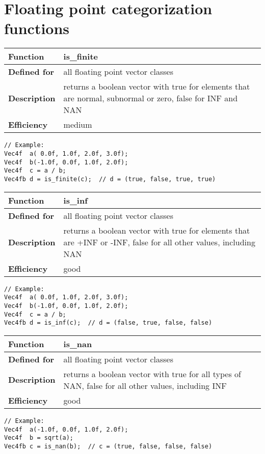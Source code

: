 \documentclass[vcl_manual.tex]{subfiles}
\begin{document}
\section{Floating point categorization functions}\label{FloatingPointCategorizationFunctions}

\begin{tabular}{|p{25mm}|p{100mm}|}
\hline
\bfseries Function & is\_finite \\ \hline
\bfseries Defined for & all floating point vector classes \\ \hline
\bfseries Description & returns a boolean vector with true for elements that are normal, subnormal or zero, false for INF and NAN \\ \hline
\bfseries Efficiency & medium \\ \hline
\end{tabular}
\begin{lstlisting}[frame=none]
// Example:
Vec4f  a( 0.0f, 1.0f, 2.0f, 3.0f);
Vec4f  b(-1.0f, 0.0f, 1.0f, 2.0f);
Vec4f  c = a / b;
Vec4fb d = is_finite(c);  // d = (true, false, true, true)
\end{lstlisting}


\begin{tabular}{|p{25mm}|p{100mm}|}
\hline
\bfseries Function & is\_inf \\ \hline
\bfseries Defined for & all floating point vector classes \\ \hline
\bfseries Description & returns a boolean vector with true for elements that are +INF or -INF, false for all other values, including NAN \\ \hline
\bfseries Efficiency & good \\ \hline
\end{tabular}
\begin{lstlisting}[frame=none]
// Example:
Vec4f  a( 0.0f, 1.0f, 2.0f, 3.0f);
Vec4f  b(-1.0f, 0.0f, 1.0f, 2.0f);
Vec4f  c = a / b;
Vec4fb d = is_inf(c);  // d = (false, true, false, false)
\end{lstlisting}


\begin{tabular}{|p{25mm}|p{100mm}|}
\hline
\bfseries Function & is\_nan \\ \hline
\bfseries Defined for & all floating point vector classes \\ \hline
\bfseries Description & returns a boolean vector with true for all types of NAN, false for all other values, including INF \\ \hline
\bfseries Efficiency & good \\ \hline
\end{tabular}
\begin{lstlisting}[frame=none]
// Example:
Vec4f  a(-1.0f, 0.0f, 1.0f, 2.0f);
Vec4f  b = sqrt(a);
Vec4fb c = is_nan(b);  // c = (true, false, false, false)
\end{lstlisting}
\end{document}
